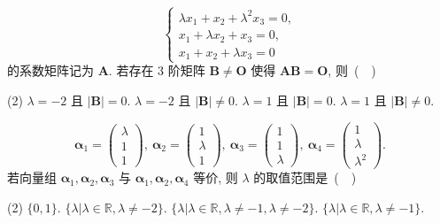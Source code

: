 \[ \begin{cases} \lambda x_1 + x_2 + \lambda^2 x_3 = 0, \\ x_1 + \lambda x_2 + x_3 = 0, \\ x_1 + x_2 + \lambda x_3 = 0 \end{cases} \]
{的系数矩阵记为 $\displaystyle \bm{A}$. 若存在 3 阶矩阵 $\displaystyle \bm{B} \neq \bm{O}$ 使得 $\displaystyle \bm{AB} = \bm{O}$, 则~(~\quad~)}
\begin{tasks}(2)
  \task $\displaystyle \lambda = -2$ 且 $\displaystyle |\bm{B}| = 0$.
  \task $\displaystyle \lambda = -2$ 且 $\displaystyle |\bm{B}| \neq 0$.
  \task $\displaystyle \lambda = 1$ 且 $\displaystyle |\bm{B}| = 0$.
  \task $\displaystyle \lambda = 1$ 且 $\displaystyle |\bm{B}| \neq 0$.
\end{tasks}

\[ \bm{\alpha}_1 = \begin{pmatrix} \lambda \\ 1 \\ 1 \end{pmatrix}, \ \bm{\alpha}_2 = \begin{pmatrix} 1 \\ \lambda \\ 1 \end{pmatrix}, \ \bm{\alpha}_3 = \begin{pmatrix} 1 \\ 1 \\ \lambda \end{pmatrix}, \ \bm{\alpha}_4 = \begin{pmatrix} 1 \\ \lambda \\ \lambda^2 \end{pmatrix}. \]
{若向量组 $\displaystyle \bm{\alpha}_1, \bm{\alpha}_2, \bm{\alpha}_3$ 与 $\displaystyle \bm{\alpha}_1, \bm{\alpha}_2, \bm{\alpha}_4$ 等价, 则 $\displaystyle \lambda$ 的取值范围是~(~\quad~)}
\begin{tasks}(2)
  \task $\displaystyle \{0, 1\}.$
  \task $\displaystyle \{\lambda | \lambda \in \mathbb{R}, \lambda \neq -2\}.$
  \task $\displaystyle \{\lambda | \lambda \in \mathbb{R}, \lambda \neq -1, \lambda \neq -2\}.$
  \task $\displaystyle \{\lambda | \lambda \in \mathbb{R}, \lambda \neq -1\}.$
\end{tasks}

